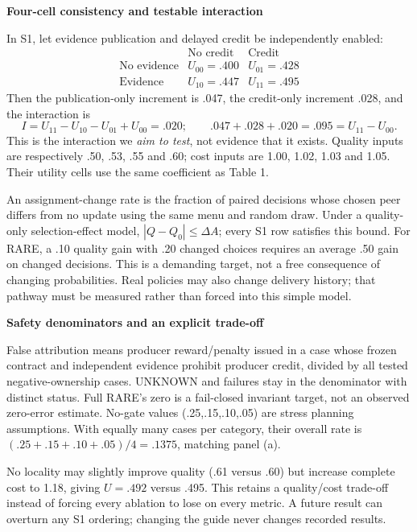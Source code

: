 \documentclass[10pt,a4paper]{article}
\newcommand{\lead}[1]{\vspace{4pt}\textbf{#1}\par}
\begin{document}
\lead{Four-cell consistency and testable interaction}
In S1, let evidence publication and delayed credit be independently enabled:
\[
\begin{array}{c|cc}
 & \text{No credit} & \text{Credit}\\\hline
\text{No evidence} & U_{00}=.400 & U_{01}=.428\\
\text{Evidence} & U_{10}=.447 & U_{11}=.495
\end{array}
\]
Then the publication-only increment is .047, the credit-only increment .028,
and the interaction is
\[
 I=U_{11}-U_{10}-U_{01}+U_{00}=.020;
 \qquad .047+.028+.020=.095=U_{11}-U_{00}.
\]
This is the interaction we \emph{aim to test}, not evidence that it exists.
Quality inputs are respectively .50, .53, .55 and .60; cost inputs are 1.00,
1.02, 1.03 and 1.05. Their utility cells use the same coefficient as Table 1.

An assignment-change rate is the fraction of paired decisions whose chosen peer
differs from no update using the same menu and random draw. Under a quality-only
selection-effect model, $|Q-Q_0|\leq\Delta A$; every S1 row satisfies this bound.
For RARE, a .10 quality gain with .20 changed choices requires an average .50
gain on changed decisions. This is a demanding target, not a free consequence
of changing probabilities. Real policies may also change delivery history;
that pathway must be measured rather than forced into this simple model.

\lead{Safety denominators and an explicit trade-off}
False attribution means producer reward/penalty issued in a case whose frozen
contract and independent evidence prohibit producer credit, divided by all
tested negative-ownership cases. UNKNOWN and failures stay in the denominator
with distinct status. Full RARE's zero is a fail-closed invariant target, not
an observed zero-error estimate. No-gate values (.25,.15,.10,.05) are stress
planning assumptions. With equally many cases per category, their overall rate
is $(.25+.15+.10+.05)/4=.1375$, matching panel (a).

No locality may slightly improve quality (.61 versus .60) but increase complete
cost to 1.18, giving $U=.492$ versus .495. This retains a quality/cost trade-off
instead of forcing every ablation to lose on every metric. A future result can
overturn any S1 ordering; changing the guide never changes recorded results.
\end{document}
